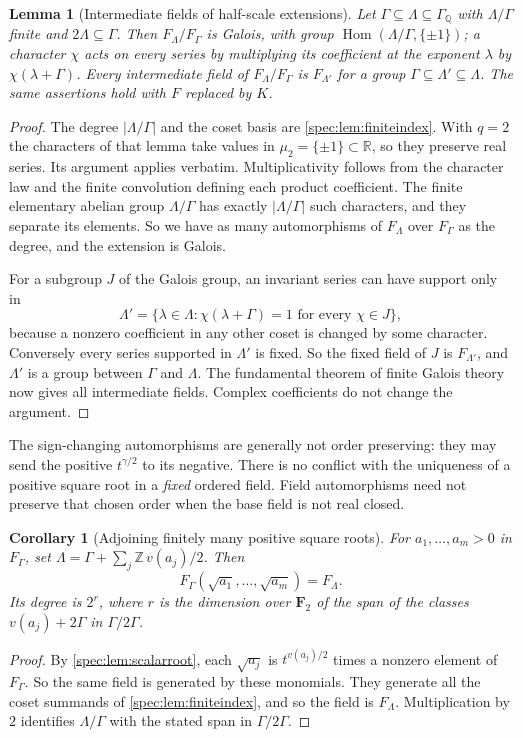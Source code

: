 \documentclass[11pt,a4paper]{article}
\numberwithin{equation}{section}
\newtheorem{lemma}[lemma]{Lemma}
\newtheorem{corollary}[corollary]{Corollary}
\theoremstyle{definition}
\theoremstyle{remark}
\newcommand{\R}{\mathbb R}
\newcommand{\Q}{\mathbb Q}
\newcommand{\Z}{\mathbb Z}
\newcommand{\Hom}{\operatorname{Hom}}
\begin{document}
\begin{lemma}[Intermediate fields of half-scale extensions]
\label{spec:hank:lem:intermediate}
Let $\Gamma\subseteq\Lambda\subseteq\Gamma_\Q$ with $\Lambda/\Gamma$ finite and
$2\Lambda\subseteq\Gamma$. Then $F_\Lambda/F_\Gamma$ is Galois, with group
$\Hom(\Lambda/\Gamma,\{\pm1\})$; a character $\chi$ acts on every series by
multiplying its coefficient at the exponent $\lambda$ by $\chi(\lambda+\Gamma)$.
Every intermediate field of $F_\Lambda/F_\Gamma$ is $F_{\Lambda'}$ for a group
$\Gamma\subseteq\Lambda'\subseteq\Lambda$. The same assertions hold with $F$
replaced by $K$.
\end{lemma}
\begin{proof}
The degree $|\Lambda/\Gamma|$ and the coset basis are
\cref{spec:lem:finiteindex}. With $q=2$ the characters of that lemma take
values in $\mu_2=\{\pm1\}\subset\R$, so they preserve real series. Its
argument applies verbatim. Multiplicativity follows from the character law
and the finite convolution defining each product coefficient. The finite
elementary abelian group $\Lambda/\Gamma$ has exactly $|\Lambda/\Gamma|$ such
characters, and they separate its elements. So we have as many automorphisms
of $F_\Lambda$ over $F_\Gamma$ as the degree, and the extension is Galois.

For a subgroup $J$ of the Galois group, an invariant series can have support
only in
\[
 \Lambda'=\{\lambda\in\Lambda:
       \chi(\lambda+\Gamma)=1\text{ for every }\chi\in J\},
\]
because a nonzero coefficient in any other coset is changed by some
character. Conversely every series supported in $\Lambda'$ is fixed. So the
fixed field of $J$ is $F_{\Lambda'}$, and $\Lambda'$ is a group between
$\Gamma$ and $\Lambda$. The fundamental theorem of finite Galois theory now
gives all intermediate fields. Complex coefficients do not change the
argument.
\end{proof}

The sign-changing automorphisms are generally not order preserving: they may
send the positive $t^{\gamma/2}$ to its negative. There is no conflict with
the uniqueness of a positive square root in a \emph{fixed} ordered field.
Field automorphisms need not preserve that chosen order when the base field
is not real closed.

\begin{corollary}[Adjoining finitely many positive square roots]
\label{spec:hank:cor:adjoin}
For $a_1,\ldots,a_m>0$ in $F_\Gamma$, set $\Lambda=\Gamma+\sum_j\Z\,v(a_j)/2$.
Then
\[
 F_\Gamma(\sqrt{a_1},\ldots,\sqrt{a_m})=F_\Lambda.
\]
Its degree is $2^r$, where $r$ is the dimension over $\mathbf F_2$ of the span
of the classes $v(a_j)+2\Gamma$ in $\Gamma/2\Gamma$.
\end{corollary}
\begin{proof}
By \cref{spec:lem:scalarroot}, each $\sqrt{a_j}$ is $t^{v(a_j)/2}$ times a
nonzero element of $F_\Gamma$. So the same field is generated by these
monomials. They generate all the coset summands of
\cref{spec:lem:finiteindex}, and so the field is $F_\Lambda$. Multiplication
by $2$ identifies $\Lambda/\Gamma$ with the stated span in $\Gamma/2\Gamma$.
\end{proof}
\end{document}
